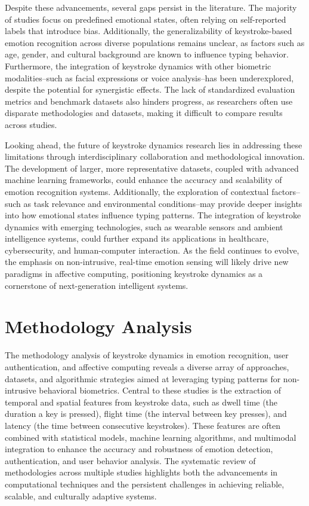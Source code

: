 \documentclass[conference]{IEEEtran}
\begin{document}
Despite these advancements, several gaps persist in the literature. The majority of studies focus on predefined emotional states, often relying on self-reported labels that introduce bias. Additionally, the generalizability of keystroke-based emotion recognition across diverse populations remains unclear, as factors such as age, gender, and cultural background are known to influence typing behavior. Furthermore, the integration of keystroke dynamics with other biometric modalities--such as facial expressions or voice analysis--has been underexplored, despite the potential for synergistic effects. The lack of standardized evaluation metrics and benchmark datasets also hinders progress, as researchers often use disparate methodologies and datasets, making it difficult to compare results across studies.  

Looking ahead, the future of keystroke dynamics research lies in addressing these limitations through interdisciplinary collaboration and methodological innovation. The development of larger, more representative datasets, coupled with advanced machine learning frameworks, could enhance the accuracy and scalability of emotion recognition systems. Additionally, the exploration of contextual factors--such as task relevance and environmental conditions--may provide deeper insights into how emotional states influence typing patterns. The integration of keystroke dynamics with emerging technologies, such as wearable sensors and ambient intelligence systems, could further expand its applications in healthcare, cybersecurity, and human-computer interaction. As the field continues to evolve, the emphasis on non-intrusive, real-time emotion sensing will likely drive new paradigms in affective computing, positioning keystroke dynamics as a cornerstone of next-generation intelligent systems.

\section{Methodology Analysis}

The methodology analysis of keystroke dynamics in emotion recognition, user authentication, and affective computing reveals a diverse array of approaches, datasets, and algorithmic strategies aimed at leveraging typing patterns for non-intrusive behavioral biometrics. Central to these studies is the extraction of temporal and spatial features from keystroke data, such as dwell time (the duration a key is pressed), flight time (the interval between key presses), and latency (the time between consecutive keystrokes). These features are often combined with statistical models, machine learning algorithms, and multimodal integration to enhance the accuracy and robustness of emotion detection, authentication, and user behavior analysis. The systematic review of methodologies across multiple studies highlights both the advancements in computational techniques and the persistent challenges in achieving reliable, scalable, and culturally adaptive systems.  
\end{document}
